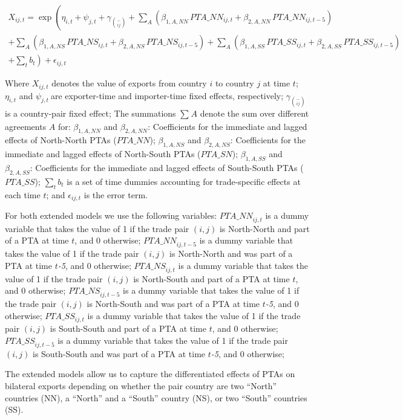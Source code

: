 \begin{multline}
    X_{ij,t} = \exp\left(\eta_{i,t} + \psi_{j,t} + \gamma_{\binom{-}{ij}} + \sum_{A}\left(\beta_{1,A,NN} \, PTA\_NN_{ij,t} + \beta_{2,A,NN} \, PTA\_NN_{ij,t-5}\right) \right. \\
    + \sum_{A}\left(\beta_{1,A,NS} \, PTA\_NS_{ij,t} + \beta_{2,A,NS} \, PTA\_NS_{ij,t-5}\right) + \sum_{A}\left(\beta_{1,A,SS} \, PTA\_SS_{ij,t} + \beta_{2,A,SS} \, PTA\_SS_{ij,t-5}\right) \\
    + \left. \sum_{t} b_{t} \right) + \epsilon_{ij,t}
\end{multline}

Where \(X_{ij,t}\)\hspace{0pt} denotes the value of exports from country
\(i\) to country \(j\) at time \(t\); \(\eta_{i,t}\) and
\(\psi_{j,t}\ \)are exporter-time and importer-time fixed effects,
respectively; \(\gamma_{\binom{-}{ij}}\) is a country-pair fixed effect;
The summations \hspace{0pt}\(\sum_{}^{}A\) denote the sum over different
agreements \(A\) for: \(\beta_{1,A,NN}\) and \(\beta_{2,A,NN}\):
Coefficients for the immediate and lagged effects of North-North PTAs
\hspace{0pt}(\(PTA\_ NN\)); \(\beta_{1,A,NS}\) and \(\beta_{2,A,NS}\):
Coefficients for the immediate and lagged effects of North-South PTAs
(\(PTA\_ SN\)); \(\beta_{1,A,SS}\) and \(\beta_{2,A,SS}\): Coefficients
for the immediate and lagged effects of South-South PTAs (\(PTA\_ SS\));
\(\sum_{t}^{}b_{t}\) is a set of time dummies accounting for
trade-specific effects at each time \(t\); and \(\epsilon_{ij,t}\) is
the error term.

For both extended models we use the following variables:
\({PTA\_ NN}_{ij,t}\) is a dummy variable that takes the value of 1 if
the trade pair \((i,j)\) is North-North and part of a PTA at time \(t\),
and 0 otherwise; \({PTA\_ NN}_{ij,t - 5}\) is a dummy variable that
takes the value of 1 if the trade pair \((i,j)\) is North-North and was
part of a PTA at time \(t\)\emph{-5}, and 0 otherwise;
\({PTA\_ NS}_{ij,t}\) is a dummy variable that takes the value of 1 if
the trade pair \((i,j)\) is North-South and part of a PTA at time \(t\),
and 0 otherwise; \({PTA\_ NS}_{ij,t - 5}\) is a dummy variable that
takes the value of 1 if the trade pair \((i,j)\) is North-South and was
part of a PTA at time \(t\)\emph{-5}, and 0 otherwise;
\({PTA\_ SS}_{ij,t}\) is a dummy variable that takes the value of 1 if
the trade pair \((i,j)\) is South-South and part of a PTA at time \(t\),
and 0 otherwise; \({PTA\_ SS}_{ij,t - 5}\) is a dummy variable that
takes the value of 1 if the trade pair \((i,j)\) is South-South and was
part of a PTA at time \(t\)\emph{-5}, and 0 otherwise;

The extended models allow us to capture the differentiated effects of
PTAs on bilateral exports depending on whether the pair country are two
``North'' countries (NN), a ``North'' and a ``South'' country (NS), or
two ``South'' countries (SS).